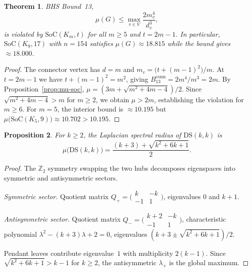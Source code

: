 \documentclass[preprint,12pt]{elsarticle}
\newtheorem{theorem}{Theorem}[section]
\newtheorem{proposition}[theorem]{Proposition}
\theoremstyle{definition}
\theoremstyle{remark}
\newcommand{\SoC}{\mathrm{SoC}}       %
\newcommand{\DS}{\mathrm{DS}}          %
\newcommand{\Lspec}{\mu}               %
\begin{document}

\begin{theorem}\label{thm:bound13}
  BHS Bound~13,
  \begin{equation}\label{eq:bound13}
    \Lspec(G) \leq \max_{v \in V} \frac{2m_v^4}{d_v^3},
  \end{equation}
  is violated by $\SoC(K_m, t)$ for all $m \geq 5$ and $t = 2m - 1$.
  In particular, $\SoC(K_9, 17)$ with $n = 154$ satisfies
  $\Lspec(G) \approx 18.815$ while the bound gives $\approx 18.000$.
\end{theorem}

\begin{proof}
  The connector vertex has $d = m$ and
  $m_v = \bigl(t + (m-1)^2\bigr)/m$. At $t = 2m - 1$ we have
  $t + (m-1)^2 = m^2$, giving
  $B_{13}^{\mathrm{conn}} = 2m^4/m^3 = 2m$.
  By Proposition~\ref{prop:mu-soc}, $\Lspec = (3m + \sqrt{m^2 + 4m - 4})/2$.
  Since $\sqrt{m^2 + 4m - 4} > m$ for $m \geq 2$, we obtain
  $\Lspec > 2m$, establishing the violation for $m \geq 6$.
  For $m = 5$, the interior bound is $\approx 10.195$ but
  $\Lspec\bigl(\SoC(K_5, 9)\bigr) \approx 10.702 > 10.195$.
\end{proof}



\begin{proposition}\label{prop:mu-ds}
  For $k \geq 2$, the Laplacian spectral radius of $\DS(k,k)$ is
  \begin{equation}\label{eq:mu-ds}
    \Lspec\bigl(\DS(k,k)\bigr)
    = \frac{(k+3) + \sqrt{k^2 + 6k + 1}}{2}.
  \end{equation}
\end{proposition}

\begin{proof}
  The $\mathbb{Z}_2$ symmetry swapping the two hubs decomposes
  eigenspaces into symmetric and antisymmetric sectors.

  \emph{Symmetric sector.} Quotient matrix
  $Q_+ = \bigl(\begin{smallmatrix} k & -k \\ -1 & 1 \end{smallmatrix}\bigr)$,
  eigenvalues $0$ and $k+1$.

  \emph{Antisymmetric sector.} Quotient matrix
  $Q_- = \bigl(\begin{smallmatrix} k+2 & -k \\ -1 & 1 \end{smallmatrix}\bigr)$,
  characteristic polynomial $\lambda^2 - (k+3)\lambda + 2 = 0$,
  eigenvalues $(k+3 \pm \sqrt{k^2+6k+1})/2$.

  Pendant leaves contribute eigenvalue~$1$ with multiplicity $2(k-1)$.
  Since $\sqrt{k^2+6k+1} > k-1$ for $k \geq 2$, the antisymmetric
  $\lambda_+$ is the global maximum.
\end{proof}
\end{document}
